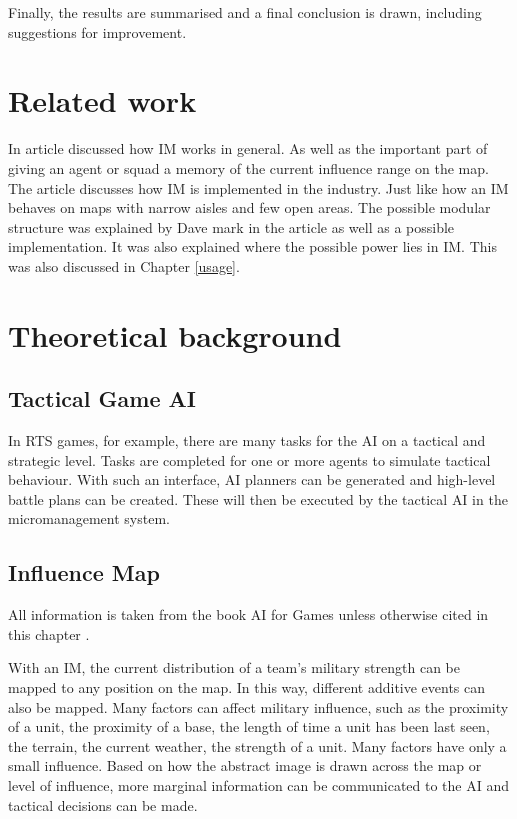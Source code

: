 \documentclass[]{report}
\begin{document}
	Finally, the results are summarised and a final conclusion is drawn, including suggestions for improvement. 
	
	\chapter{Related work} \label{relatedwork}
	In \cite{10.5555/2821138} article discussed how \ac{IM} works in general. As well as the important part of giving an agent or squad a memory of the current influence range on the map.\newline \newline
	The article \citep{gameDevInfluenceMap} discusses how \ac{IM} is implemented in the industry. Just like how an \ac{IM} behaves on maps with narrow aisles and few open areas. \newline \newline
	The possible modular structure was explained by Dave mark in the article \citep{gameAIPro} as well as a possible implementation. It was also explained where the possible power lies in \ac{IM}. This was also discussed in Chapter \ref{usage}. 
	
	\chapter{Theoretical background} \label{theoreticalbackground}
	
	\section{Tactical Game AI} \label{tacticalGameAi}
	In \ac{RTS} games, for example, there are many tasks for the \ac{AI} on a tactical and strategic level. Tasks are completed for one or more agents to simulate tactical behaviour. With such an interface, \ac{AI} planners can be generated and high-level battle plans can be created. These will then be executed by the tactical \ac{AI} in the micromanagement system. \citep{tacticalGameAi} \newline
	
	
	\section{Influence Map}
	All information is taken from the book \ac{AI} for Games unless otherwise cited in this chapter \citep{AIforGamesTactical}.	\newline

	With an \ac{IM}, the current distribution of a team's military strength can be mapped to any position on the map. In this way, different additive events can also be mapped. Many factors can affect military influence, such as the proximity of a unit, the proximity of a base, the length of time a unit has been last seen, the terrain, the current weather, the strength of a unit. Many factors have only a small influence. Based on how the abstract image is drawn across the map or level of influence, more marginal information can be communicated to the \ac{AI} and tactical decisions can be made.
	
\end{document}
